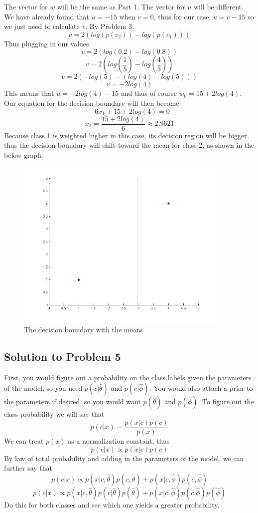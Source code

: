 \documentclass[11pt,psfig]{article}
\begin{document}
The vector for $w$ will be the same as Part 1. The vector for $u$ will be different. We have already found that $u=-15$ when $v=0$, thus for our case, $u = v-15$ so we just need to calculate $v$. By Problem 3, 
\[
v = 2(log(p(c_2)) - log(p(c_1)))
\]
Thus plugging in our values
\[
v = 2( log(0.2) - log(0.8) )
\]
\[
v = 2 ( log(\frac{1}{5}) - log(\frac{4}{5}) )
\]
\[
v = 2 ( -log(5) - ( log(4) - log(5) ) )
\]
\[
v = -2 log(4)
\]
This means that $u = -2log(4)-15$ and thus of course $w_0 = 15+2log(4)$. Our equation for the decision boundary will then become
\[
-6 x_1 + 15 + 2log(4) = 0
\]
\[
x_1 = \frac{15+2log(4)}{6} \approx 2.9621
\]
Because class 1 is weighted higher in this case, its decision region will be bigger, thus the decision boundary will shift toward the mean for class 2, as shown in the below graph. 

\begin{figure}[H]
\centering
\includegraphics[height=3.25in]{plot4_part2.jpg}
\caption{The decision boundary with the means}
\end{figure}

\subsection*{Solution to Problem 5}

First, you would figure out a probability on the class labels given the parameters of the model, so you need
$p(c|\hat{\theta})$ and $p(c|\hat{\phi})$. You would also attach a prior to the parameters if desired, so you would want $p(\hat{\theta})$ and $p(\hat{\phi})$. 
To figure out the class probability we will say that
\[
p(c|x) = \frac{p(x|c)p(c)}{p(x)}
\]
We can treat $p(x)$ as a normalization constant, thus
\[
p(c|x) \propto p(x|c)p(c)
\]
By law of total probability and adding in the parameters of the model, we can further say that
\[
p(c|x) \propto p(x|c,\hat{\theta})p(c,\hat{\theta}) + p(x|c,\hat{\phi})p(c,\hat{\phi})
\]
\[
p(c|x) \propto p(x|c,\hat{\theta})p(c|\hat{\theta})p(\hat{\theta}) + p(x|c,\hat{\phi})p(c|\hat{\phi})p(\hat{\phi})
\]
Do this for both classes and see which one yields a greater probability. 
\end{document}
